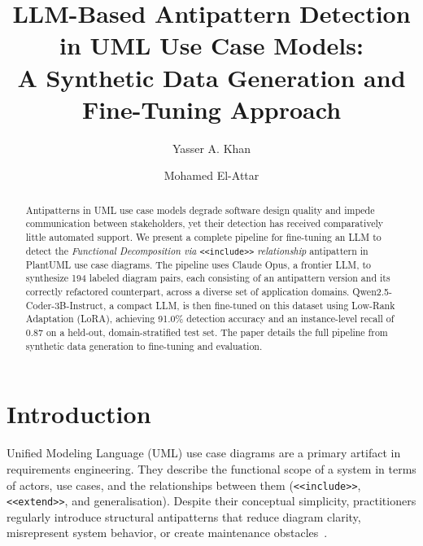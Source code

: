\documentclass[sigconf,review,anonymous]{acmart}
\begin{document}
\title{LLM-Based Antipattern Detection in UML Use Case Models:\\
  A Synthetic Data Generation and Fine-Tuning Approach}

\author{Yasser A. Khan}

\author{Mohamed El-Attar}

\begin{abstract}
Antipatterns in UML use case models degrade software design quality and
impede communication between stakeholders, yet their detection has received
comparatively little automated support.  We present a complete pipeline for
fine-tuning an LLM to detect the \emph{Functional Decomposition
via} \texttt{<<include>>} \emph{relationship} antipattern in PlantUML use
case diagrams.  The pipeline uses Claude Opus, a frontier LLM,
to synthesize 194 labeled diagram pairs, each consisting of an antipattern
version and its correctly refactored counterpart, across a diverse set of
application domains.  Qwen2.5-Coder-3B-Instruct, a compact LLM, is then
fine-tuned on this dataset using Low-Rank Adaptation (LoRA), achieving
91.0\% detection accuracy and an instance-level recall of 0.87 on a held-out, domain-stratified test set.  The paper details the full pipeline from synthetic data generation to fine-tuning and evaluation.
\end{abstract}


\maketitle

\section{Introduction}
\label{sec:intro}

Unified Modeling Language (UML) use case diagrams are a primary artifact in
requirements engineering.  They describe the functional scope of a
system in terms of actors, use cases, and the relationships between them
(\texttt{<<include>>}, \texttt{<<extend>>}, and generalisation).  Despite their
conceptual simplicity, practitioners regularly introduce structural antipatterns that reduce
diagram clarity, misrepresent system behavior, or create maintenance
obstacles~\cite{lilly1999pitfalls,anda2001quality}.
\end{document}
